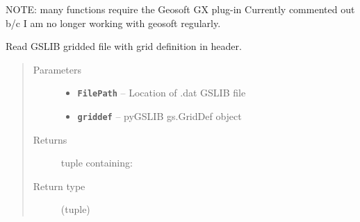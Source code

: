\documentclass[letterpaper,10pt,english]{sphinxmanual}
\begin{document}
NOTE: many functions require the Geosoft GX plug-in
Currently commented out b/c I am no longer working with geosoft regularly.

\begin{fulllineitems}
\label{index:pygeos.io.read_GSLIB}
Read GSLIB gridded file with grid definition in header.
\begin{quote}\begin{description}
\item[{Parameters}] \leavevmode\begin{itemize}
\item {} 
\textbf{\texttt{FilePath}} -- Location of .dat GSLIB file

\item {} 
\textbf{\texttt{griddef}} -- pyGSLIB gs.GridDef object

\end{itemize}

\item[{Returns}] \leavevmode

tuple containing:



\item[{Return type}] \leavevmode
(tuple)

\end{description}\end{quote}

\end{fulllineitems}

\end{document}
